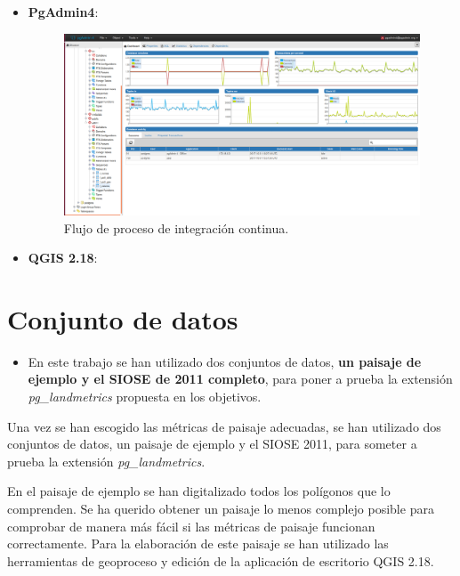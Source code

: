 \begin{itemize}
\item\textbf{PgAdmin4}: 

\begin{figure}
\begin{center}
\includegraphics[width=\textwidth]{Metodologia/Figs/carga-siose-2011.png}
\caption{Flujo de proceso de integración continua. \label{fig:carga}}
\end{center}
\end{figure}

\item\textbf{QGIS 2.18}: 
\end{itemize}

\section{Conjunto de datos}

\begin{graybox}
\begin{itemize}
\item En este trabajo se han utilizado dos conjuntos de datos, \textbf{un paisaje de ejemplo y el SIOSE de 2011 completo}, para poner a prueba la extensión \textit{pg\_landmetrics} propuesta en los objetivos.
\end{itemize}
\end{graybox}

Una vez se han escogido las métricas de paisaje adecuadas, se han utilizado dos conjuntos de datos, un paisaje de ejemplo y el SIOSE 2011, para someter a prueba la extensión \textit{pg\_landmetrics}.

En el paisaje de ejemplo se han digitalizado todos los polígonos que lo comprenden. Se ha querido obtener un paisaje lo menos complejo posible para comprobar de manera más fácil si las métricas de paisaje funcionan correctamente. Para la elaboración de este paisaje se han utilizado las herramientas de geoproceso y edición de la aplicación de escritorio QGIS 2.18. 

